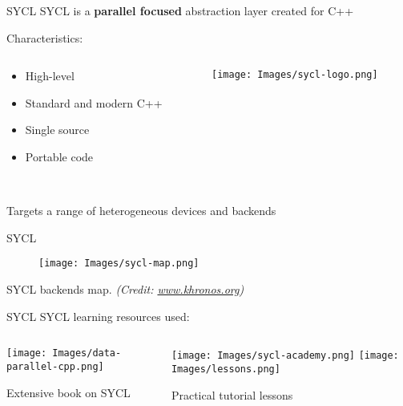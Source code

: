 \begin{frame}{SYCL}
SYCL is a \textbf{parallel focused} abstraction layer created for C++

Characteristics:
\begin{columns}
  \begin{column}{0.48\textwidth}
    \begin{itemize}
      \item High-level
      \item Standard and modern C++
      \item Single source
      \item Portable code \\~\\
    \end{itemize}
  \end{column}
  \begin{column}{0.48\textwidth}
    \begin{center}
      \texttt{[image: Images/sycl-logo.png]}
    \end{center}
  \end{column}
\end{columns}
\block{}
\begin{center}
  Targets a range of heterogeneous devices and backends
\end{center}
\endblock{}
\end{frame}
\begin{frame}{SYCL}
\begin{center}
\begin{figure}[H]
  \texttt{[image: Images/sycl-map.png]}
\end{figure}
SYCL backends map. \textit{(Credit: \url{www.khronos.org})}
\end{center}
\end{frame}
\begin{frame}{SYCL}
  SYCL learning resources used:
\begin{columns}
  \begin{column}{0.48\textwidth}
    \begin{center}
    \texttt{[image: Images/data-parallel-cpp.png]}

    Extensive book on SYCL
    \end{center}
  \end{column}
  \begin{column}{0.385\textwidth}
    \begin{center}
    \texttt{[image: Images/sycl-academy.png]}
    \texttt{[image: Images/lessons.png]}

    Practical tutorial lessons
    \end{center}
  \end{column}
\end{columns}
\end{frame}
